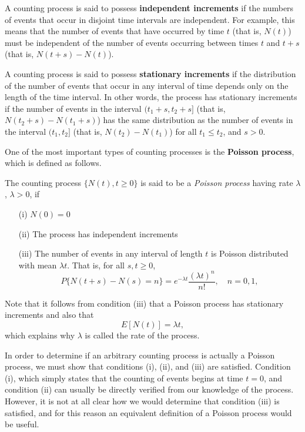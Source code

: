 \documentclass[lang=cn,10pt,thmcnt=section]{elegantbook}
\begin{document}
A counting process is said to possess \textbf{independent increments} if the numbers of events that occur in disjoint time intervals are independent. For example, this means that the number of events that have occurred by time \(t\) (that is, \(N(t)\)) must be independent of the number of events occurring between times \(t\) and \(t + s\) (that is, \(N(t + s) - N(t)\)).

A counting process is said to possess \textbf{stationary increments} if the distribution of the number of events that occur in any interval of time depends only on the length of the time interval. In other words, the process has stationary increments if the number of events in the interval \((t_1 + s, t_2 + s]\) (that is, \(N(t_2 + s) - N(t_1 + s)\)) has the same distribution as the number of events in the interval \((t_1, t_2]\) (that is, \(N(t_2) - N(t_1)\)) for all \(t_1 \leq t_2\), and \(s > 0\).

One of the most important types of counting processes is the \textbf{Poisson process}, which is defined as follows.
\begin{definition}
The counting process $\{N(t), t \geq 0\}$ is said to be a \textit{Poisson process} having rate $\lambda$, $\lambda > 0$, if

\begin{itemize}
    \item[(i)] $N(0) = 0$
    \item[(ii)] The process has independent increments
    \item[(iii)] The number of events in any interval of length $t$ is Poisson distributed with mean $\lambda t$. That is, for all $s, t \geq 0$,
    \begin{equation}
    P\{N(t+s) - N(s) = n\} = e^{-\lambda t} \frac{(\lambda t)^n}{n!}, \quad n = 0, 1,
    \end{equation}
\end{itemize}
\end{definition}

Note that it follows from condition (iii) that a Poisson process has stationary increments and also that
\[
E[N(t)] = \lambda t,
\]
which explains why \(\lambda\) is called the rate of the process.

In order to determine if an arbitrary counting process is actually a Poisson process, we must show that conditions (i), (ii), and (iii) are satisfied. Condition (i), which simply states that the counting of events begins at time \(t = 0\), and condition (ii) can usually be directly verified from our knowledge of the process. However, it is not at all clear how we would determine that condition (iii) is satisfied, and for this reason an equivalent definition of a Poisson process would be useful.
\end{document}
